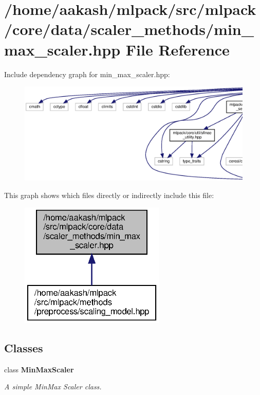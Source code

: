 \section{/home/aakash/mlpack/src/mlpack/core/data/scaler\+\_\+methods/min\+\_\+max\+\_\+scaler.hpp File Reference}
\label{min__max__scaler_8hpp}
Include dependency graph for min\+\_\+max\+\_\+scaler.\+hpp\+:
\nopagebreak
\begin{figure}[H]
\begin{center}
\leavevmode
\includegraphics[width=350pt]{min__max__scaler_8hpp__incl}
\end{center}
\end{figure}
This graph shows which files directly or indirectly include this file\+:
\nopagebreak
\begin{figure}[H]
\begin{center}
\leavevmode
\includegraphics[width=196pt]{min__max__scaler_8hpp__dep__incl}
\end{center}
\end{figure}
\subsection*{Classes}
\begin{DoxyCompactItemize}
\item 
class \textbf{ Min\+Max\+Scaler}
\begin{DoxyCompactList}\small\item\em A simple Min\+Max Scaler class. \end{DoxyCompactList}\end{DoxyCompactItemize}
